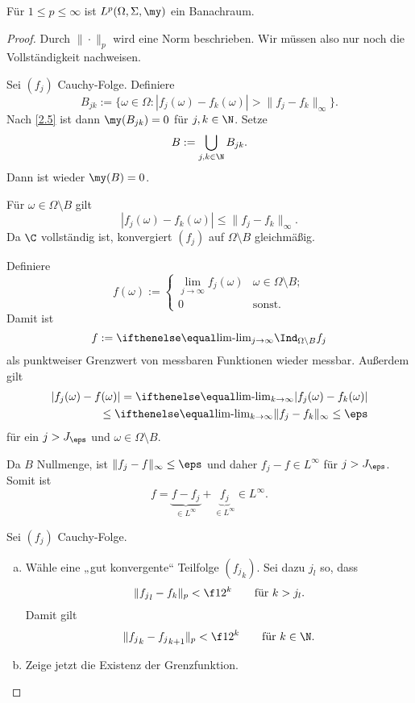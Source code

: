 \begin{st} \label{2.12}
	Für $1 \le p \le \infty$ ist $L^p(\Omega, \Sigma, \my)$ ein Banachraum.
	\begin{proof}
		Durch $\|\cdot\|_p$ wird eine Norm beschrieben.
		Wir müssen also nur noch die Vollständigkeit nachweisen.
		\begin{seg}[$p=\infty$]
			Sei $(f_j)$ Cauchy-Folge.
			Definiere
			\[
				B_{jk} := \Big\{ \omega \in \Omega : |f_j(\omega) - f_k(\omega)| > \|f_j-f_k\|_\infty \Big\}.
			\]
			Nach \ref{2.5} ist dann $\my(B_{jk}) = 0$ für $j,k\in \N$. 
			Setze
			\[
				B := \bigcup_{j,k\in \N} B_{jk}.
			\]
			Dann ist wieder $\my(B) = 0$.

			Für $\omega \in \Omega \setminus B$ gilt
			\[
				|f_j(\omega) - f_k(\omega)| \le \|f_j-f_k\|_\infty.
			\]
			Da $\C$ vollständig ist, konvergiert $(f_j)$ auf $\Omega \setminus B$ gleichmäßig.

			Definiere
			\[
				f(\omega) := \begin{cases}
					\lim\limits_{j \to \infty} f_j(\omega) & \omega \in \Omega \setminus B ;\\
					0 & \text{sonst.}
				\end{cases}
			\]
			Damit ist
			\[
				f := \lim_{j\to \infty} \Ind_{\Omega \setminus B} f_j
			\]
			als punktweiser Grenzwert von messbaren Funktionen wieder messbar.
			Außerdem gilt
			\begin{align*}
				|f_j(\omega) - f(\omega) |
				= \lim_{k\to \infty} |f_j(\omega) - f_k(\omega)| \\
				\le \lim_{k\to \infty} \|f_j - f_k\|_{\infty}
				\le \eps
			\end{align*}
			für ein $j > J_\eps$ und $\omega \in \Omega \setminus B$.

			Da $B$ Nullmenge, ist $\|f_j - f\|_\infty \le \eps$ und daher $f_j - f \in L^\infty$ für $j > J_\eps$.
			Somit ist
			\[
				f = \underbrace{f - f_j}_{\in L^\infty} + \underbrace{f_j}_{\in L^\infty} \in L^\infty.
			\]
		\end{seg}
		\begin{seg}[$1 \le p < \infty$]
			Sei $(f_j)$ Cauchy-Folge.
			\begin{enumerate}[a)]
				\item
					Wähle eine „gut konvergente“ Teilfolge $({f_j}_k)$.
					Sei dazu $j_l$ so, dass 
					\[
						\|{f_j}_l - f_k\|_p < \f 1{2^k} \qquad \text{für $k>j_l$}.
					\]
					Damit gilt
					\[
						\|{f_j}_k - {f_j}_{k+1} \|_p < \f 1{2^k} \qquad \text{für $k \in \N$}.
					\]
				\item
					Zeige jetzt die Existenz der Grenzfunktion.


\end{enumerate}
\end{seg}
\end{proof}
\end{st}
